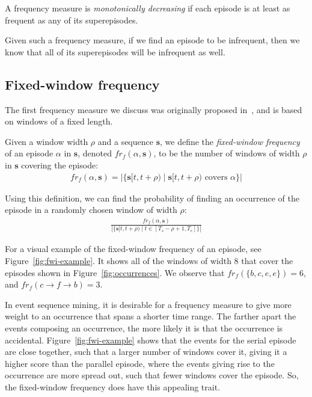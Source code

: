 \begin{definition}
A frequency measure is \emph{monotonically decreasing} if each episode is at least as frequent as any of its superepisodes.
\end{definition}

Given such a frequency measure, if we find an episode to be infrequent, then we know that all of its superepisodes will be infrequent as well.


\subsection{Fixed-window frequency}
\label{sec:fixed-window-frequency}

The first frequency measure we discuss was originally proposed in~\cite{mannila1997discovery}, and is based on windows of a fixed length.

\begin{definition}
Given a window width $ \rho $ and a sequence $ \boldsymbol{s} $, we define the \emph{fixed-window frequency} of an episode $ \alpha $ in $ \boldsymbol{s} $, denoted $ fr_f(\alpha, \boldsymbol{s}) $, to be the number of windows of width $ \rho $ in $ \boldsymbol{s} $ covering the episode:
\begin{align*}
fr_f(\alpha, \boldsymbol{s}) = | \{ \boldsymbol{s}[t, t + \rho) \mid \boldsymbol{s}[t, t + \rho) \text{ covers } \alpha \} |
\end{align*}
\end{definition}

Using this definition, we can find the probability of finding an occurrence of the episode in a randomly chosen window of width $ \rho $:
\begin{align*}
\frac{fr_f(\alpha, \boldsymbol{s})}{| \{ \boldsymbol{s}[t, t + \rho) \mid t \in [T_s - \rho + 1, T_e] \} |}
\end{align*}

For a visual example of the fixed-window frequency of an episode, see Figure~\ref{fig:fwi-example}. It shows all of the windows of width 8 that cover the episodes shown in Figure~\ref{fig:occurrences}. We observe that $ fr_f(\{ b, c, e, e \}) = 6 $, and $ fr_f(c \to f \to b) = 3 $.

In event sequence mining, it is desirable for a frequency measure to give more weight to an occurrence that spans a shorter time range. The farther apart the events composing an occurrence, the more likely it is that the occurrence is accidental. Figure~\ref{fig:fwi-example} shows that the events for the serial episode are close together, such that a larger number of windows cover it, giving it a higher score than the parallel episode, where the events giving rise to the occurrence are more spread out, such that fewer windows cover the episode. So, the fixed-window frequency does have this appealing trait.

